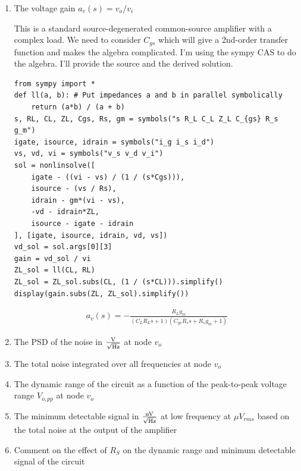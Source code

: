 \begin{enumerate}[label=(\alph*)]
  \item {\color{blue}The voltage gain $a_v(s) = v_o / v_i$}

    This is a standard source-degenerated common-source amplifier with a complex load. We need to consider $C_{gs}$ which will give a 2nd-order transfer function and makes the algebra complicated. I'm using the sympy CAS to do the algebra. I'll provide the source and the derived solution.

    \begin{verbatim}
from sympy import *
def ll(a, b): # Put impedances a and b in parallel symbolically
    return (a*b) / (a + b)
s, RL, CL, ZL, Cgs, Rs, gm = symbols("s R_L C_L Z_L C_{gs} R_s g_m")
igate, isource, idrain = symbols("i_g i_s i_d")
vs, vd, vi = symbols("v_s v_d v_i")
sol = nonlinsolve([
    igate - ((vi - vs) / (1 / (s*Cgs))),
    isource - (vs / Rs),
    idrain - gm*(vi - vs),
    -vd - idrain*ZL,
    isource - igate - idrain
], [igate, isource, idrain, vd, vs])
vd_sol = sol.args[0][3]
gain = vd_sol / vi
ZL_sol = ll(CL, RL)
ZL_sol = ZL_sol.subs(CL, (1 / (s*CL))).simplify()
display(gain.subs(ZL, ZL_sol).simplify())
    \end{verbatim}
    \begin{align*}
      a_v(s) = - \frac{R_{L} g_{m}}{\left(C_{L} R_{L} s + 1\right) \left(C_{gs} R_{s} s + R_{s} g_{m} + 1\right)}
    \end{align*}

  \item {\color{blue}The PSD of the noise in $\frac{\text{V}}{\sqrt{\text{Hz}}}$ at node $v_o$}
  \item {\color{blue}The total noise integrated over all frequencies at node $v_o$}
  \item {\color{blue}The dynamic range of the circuit as a function of the peak-to-peak voltage range $V_{o,pp}$ at node $v_o$}
  \item {\color{blue}The minimum detectable signal in $\frac{\text{nV}}{\sqrt{\text{Hz}}}$ at low frequency at $\mu V_{rms}$ based on the total noise at the output of the amplifier}
  \item {\color{blue}Comment on the effect of $R_S$ on the dynamic range and minimum detectable signal of the circuit}
\end{enumerate}


